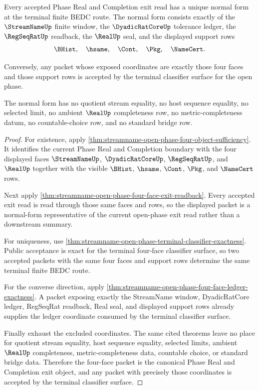 \begin{theorem}
\label{thm:streamname-open-phase-four-face-normal-form}
Every accepted Phase Real and Completion exit read has a unique normal form at the terminal finite BEDC route. The normal form consists exactly of the $\StreamNameUp$ finite window, the $\DyadicRatCoreUp$ tolerance ledger, the $\RegSeqRatUp$ readback, the $\RealUp$ seal, and the displayed support rows
$$
\BHist,\quad \hsame,\quad \Cont,\quad \Pkg,\quad \NameCert.
$$

Conversely, any packet whose exposed coordinates are exactly those four faces and those support rows is accepted by the terminal classifier surface for the open phase.

The normal form has no quotient stream equality, no host sequence equality, no selected limit, no ambient $\RealUp$ completeness row, no metric-completeness datum, no countable-choice row, and no standard bridge row.
\end{theorem}
\begin{proof}
For existence, apply \autoref{thm:streamname-open-phase-four-object-sufficiency}. It identifies the current Phase Real and Completion boundary with the four displayed faces $\StreamNameUp$, $\DyadicRatCoreUp$, $\RegSeqRatUp$, and $\RealUp$ together with the visible $\BHist$, $\hsame$, $\Cont$, $\Pkg$, and $\NameCert$ rows.

Next apply \autoref{thm:streamname-open-phase-four-face-exit-readback}. Every accepted exit read is read through those same faces and rows, so the displayed packet is a normal-form representative of the current open-phase exit read rather than a downstream summary.

For uniqueness, use \autoref{thm:streamname-open-phase-terminal-classifier-exactness}. Public acceptance is exact for the terminal four-face classifier surface, so two accepted packets with the same four faces and support rows determine the same terminal finite BEDC route.

For the converse direction, apply \autoref{thm:streamname-open-phase-four-face-ledger-exactness}. A packet exposing exactly the StreamName window, DyadicRatCore ledger, RegSeqRat readback, Real seal, and displayed support rows already supplies the ledger coordinate consumed by the terminal classifier surface.

Finally exhaust the excluded coordinates. The same cited theorems leave no place for quotient stream equality, host sequence equality, selected limits, ambient $\RealUp$ completeness, metric-completeness data, countable choice, or standard bridge data. Therefore the four-face packet is the canonical Phase Real and Completion exit object, and any packet with precisely those coordinates is accepted by the terminal classifier surface.
\end{proof}

